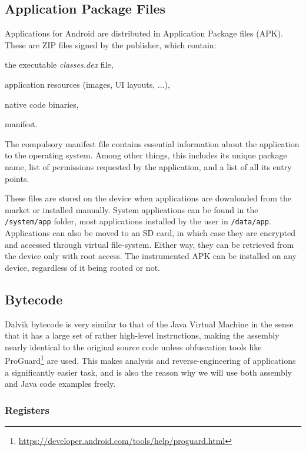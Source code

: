 \documentclass[12pt,twoside,notitlepage]{report}
\begin{document}
\subsection{Application Package Files}

Applications for Android are distributed in Application Package files (APK). These are ZIP files signed by the publisher, which contain:
\begin{inparaenum}[(i)]
\item the executable \emph{classes.dex} file,
\item application resources (images, UI layouts, ...),
\item native code binaries,
\item manifest.
\end{inparaenum}

The compulsory manifest file contains essential information about the application to the operating system. Among other things, this includes its unique package name, list of permissions requested by the application, and a list of all its entry points.

These files are stored on the device when applications are downloaded from the market or installed manually. System applications can be found in the \verb$/system/app$ folder, most applications installed by the user in \verb$/data/app$. Applications can also be moved to an SD card, in which case they are encrypted and accessed through virtual file-system. Either way, they can be retrieved from the device only with root access. The instrumented APK can be installed on any device, regardless of it being rooted or not. 

\subsection{Bytecode}

Dalvik bytecode is very similar to that of the Java Virtual Machine in the sense that it has a large set of rather high-level instructions, making the assembly nearly identical to the original source code unless obfuscation tools like ProGuard\footnote{\scriptsize\url{https://developer.android.com/tools/help/proguard.html}} are used. This makes analysis and reverse-engineering of applications a significantly easier task, and is also the reason why we will use both assembly and Java code examples freely.

\subsubsection{Registers}
\end{document}
